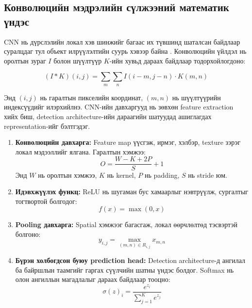 \subsection{Конволюцийн мэдрэлийн сүлжээний математик үндэс}
CNN нь дүрслэлийн локал хэв шинжийг багаас их түвшинд шаталсан байдлаар суралцдаг тул объект илрүүлэлтийн суурь хэвээр байна \cite{cnn_lecun}. Конволюцийн үйлдэл нь оролтын зураг $I$ болон шүүлтүүр $K$-ийн хувьд дараах байдлаар тодорхойлогдоно:

\begin{equation}
    (I * K)(i, j) = \sum_{m} \sum_{n} I(i-m, j-n) \cdot K(m, n)
\end{equation}

Энд $(i, j)$ нь гаралтын пикселийн координат, $(m, n)$ нь шүүлтүүрийн индексүүдийг илэрхийлнэ. CNN-ийн давхаргууд нь зөвхөн feature extraction хийх биш, detection architecture-ийн дараагийн шатуудад ашиглагдах representation-ийг бэлтгэдэг.

\begin{enumerate}
\item \textbf{Конволюцийн давхарга:} Feature map үүсгэж, ирмэг, хэлбэр, texture зэрэг локал мэдээллийг ялгана. Гаралтын хэмжээ:
\begin{equation}
O = \frac{W - K + 2P}{S} + 1
\end{equation}
Энд $W$ нь оролтын хэмжээ, $K$ нь kernel, $P$ нь padding, $S$ нь stride юм.
\item \textbf{Идэвхжүүлэх функц:} ReLU нь шугаман бус хамаарлыг нэвтрүүлж, сургалтыг тогтвортой болгодог:
\begin{equation}
f(x) = \max(0, x)
\end{equation}
\item \textbf{Pooling давхарга:} Spatial хэмжээг багасгаж, локал өөрчлөлтөд тэсвэртэй болгоно:
\begin{equation}
y_{i,j} = \max_{(m,n) \in R_{i,j}} x_{m,n}
\end{equation}
\item \textbf{Бүрэн холбогдсон буюу prediction head:} Detection architecture-д ангилал ба байршлын таамгийг гаргах сүүлчийн шатны үндэс болдог. Softmax нь олон ангиллын магадлалыг дараах байдлаар тооцно:
\begin{equation}
\sigma(z)_i = \frac{e^{z_i}}{\sum_{j=1}^{K} e^{z_j}}
\end{equation}
\end{enumerate}

